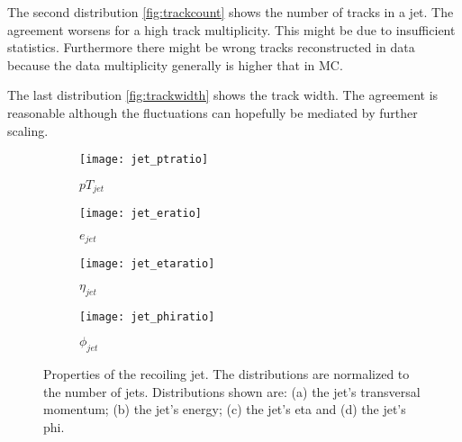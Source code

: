 The second distribution \ref{fig:trackcount} shows the number of tracks in a jet. The agreement worsens for a high track multiplicity. This might be due to insufficient statistics. Furthermore there might be wrong tracks reconstructed in data because the data multiplicity generally is higher that in MC.

The last distribution \ref{fig:trackwidth} shows the track width. The agreement is reasonable although the fluctuations can hopefully be mediated by further scaling.



\begin{figure}[h]
\centering
\begin{subfigure}[b]{0.5\figwidth}
\texttt{[image: jet\_ptratio]}
\caption[Transversal momentum of the recoiling jet]{$pT_{jet}$}
\label{fig:jetpt}
\end{subfigure}
\quad
\begin{subfigure}[b]{0.5\figwidth}
\texttt{[image: jet\_eratio]}
\caption[Energy of the recoiling jet]{$e_{jet}$}
\label{fig:jete}
\end{subfigure}


\begin{subfigure}[b]{0.5\figwidth}
\texttt{[image: jet\_etaratio]}
\caption[$\eta$ of the recoiling jet]{$\eta_{jet}$}
\label{fig:jeteta}
\end{subfigure}
\quad
\begin{subfigure}[b]{0.5\figwidth}
\texttt{[image: jet\_phiratio]}
\caption[$\phi$ of the recoiling jet]{$\phi_{jet}$}
\label{fig:jetphi}
\end{subfigure}
\caption{Properties of the recoiling jet. The distributions are normalized to the number of jets. Distributions shown are: (a) the jet's transversal momentum; (b) the jet's energy; (c) the jet's eta and (d) the jet's phi.}
\label{fig:reoilingjet}
\end{figure}




